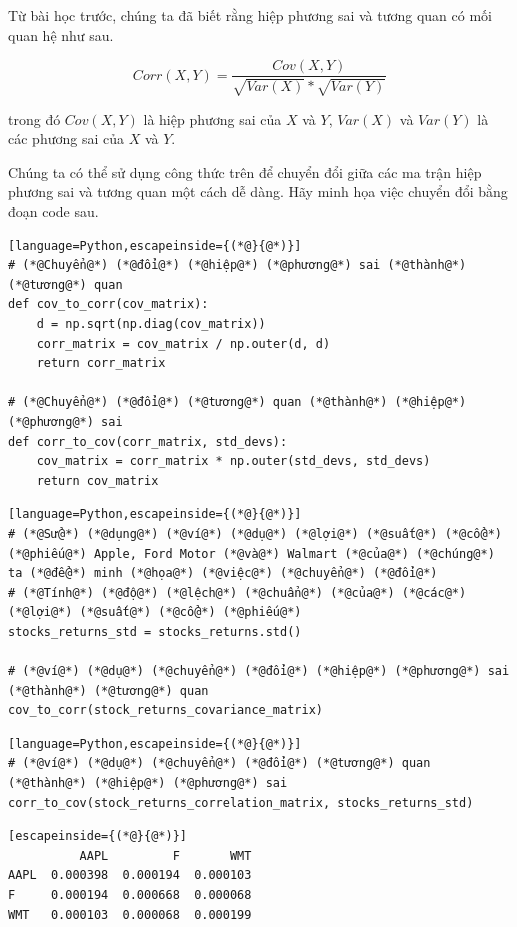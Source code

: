 Từ bài học trước, chúng ta đã biết rằng hiệp phương sai và tương quan có mối quan hệ như sau.

\[Corr(X,Y)=\frac{Cov(X,Y)}{ \sqrt{Var(X)} * \sqrt{Var(Y)}}\]

trong đó $Cov(X,Y)$ là hiệp phương sai của $X$ và $Y$, $Var(X)$ và $Var(Y)$ là các phương sai của $X$ và $Y$.

Chúng ta có thể sử dụng công thức trên để chuyển đổi giữa các ma trận hiệp phương sai và tương quan một cách dễ dàng. Hãy minh họa việc chuyển đổi bằng đoạn code sau.

\begin{lstlisting}[language=Python,escapeinside={(*@}{@*)}]
# (*@Chuyển@*) (*@đổi@*) (*@hiệp@*) (*@phương@*) sai (*@thành@*) (*@tương@*) quan
def cov_to_corr(cov_matrix):
    d = np.sqrt(np.diag(cov_matrix))
    corr_matrix = cov_matrix / np.outer(d, d)
    return corr_matrix

# (*@Chuyển@*) (*@đổi@*) (*@tương@*) quan (*@thành@*) (*@hiệp@*) (*@phương@*) sai
def corr_to_cov(corr_matrix, std_devs):
    cov_matrix = corr_matrix * np.outer(std_devs, std_devs)
    return cov_matrix
\end{lstlisting}

\begin{lstlisting}[language=Python,escapeinside={(*@}{@*)}]
# (*@Sử@*) (*@dụng@*) (*@ví@*) (*@dụ@*) (*@lợi@*) (*@suất@*) (*@cổ@*) (*@phiếu@*) Apple, Ford Motor (*@và@*) Walmart (*@của@*) (*@chúng@*) ta (*@để@*) minh (*@họa@*) (*@việc@*) (*@chuyển@*) (*@đổi@*)
# (*@Tính@*) (*@độ@*) (*@lệch@*) (*@chuẩn@*) (*@của@*) (*@các@*) (*@lợi@*) (*@suất@*) (*@cổ@*) (*@phiếu@*)
stocks_returns_std = stocks_returns.std()

# (*@ví@*) (*@dụ@*) (*@chuyển@*) (*@đổi@*) (*@hiệp@*) (*@phương@*) sai (*@thành@*) (*@tương@*) quan
cov_to_corr(stock_returns_covariance_matrix)
\end{lstlisting}

\begin{lstlisting}[language=Python,escapeinside={(*@}{@*)}]
# (*@ví@*) (*@dụ@*) (*@chuyển@*) (*@đổi@*) (*@tương@*) quan (*@thành@*) (*@hiệp@*) (*@phương@*) sai
corr_to_cov(stock_returns_correlation_matrix, stocks_returns_std)
\end{lstlisting}

\begin{lstlisting}[escapeinside={(*@}{@*)}]
          AAPL         F       WMT
AAPL  0.000398  0.000194  0.000103
F     0.000194  0.000668  0.000068
WMT   0.000103  0.000068  0.000199
\end{lstlisting}

